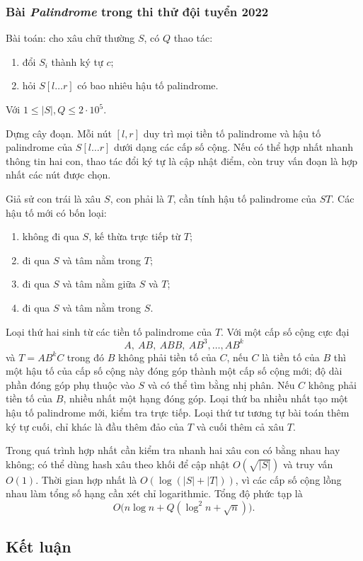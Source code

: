 \documentclass[11pt]{article}
\begin{document}
\subsubsection{Bài \emph{Palindrome} trong thi thử đội tuyển 2022}

Bài toán: cho xâu chữ thường $S$, có $Q$ thao tác:
\begin{enumerate}
  \item đổi $S_i$ thành ký tự $c$;
  \item hỏi $S[l\ldots r]$ có bao nhiêu hậu tố palindrome.
\end{enumerate}
Với $1\le |S|,Q\le 2\cdot 10^5$.

Dựng cây đoạn. Mỗi nút $[l,r]$ duy trì mọi tiền tố palindrome và hậu tố
palindrome của $S[l\ldots r]$ dưới dạng các cấp số cộng. Nếu có thể hợp nhất
nhanh thông tin hai con, thao tác đổi ký tự là cập nhật điểm, còn truy vấn đoạn
là hợp nhất các nút được chọn.

Giả sử con trái là xâu $S$, con phải là $T$, cần tính hậu tố palindrome của
$ST$. Các hậu tố mới có bốn loại:
\begin{enumerate}
  \item không đi qua $S$, kế thừa trực tiếp từ $T$;
  \item đi qua $S$ và tâm nằm trong $T$;
  \item đi qua $S$ và tâm nằm giữa $S$ và $T$;
  \item đi qua $S$ và tâm nằm trong $S$.
\end{enumerate}
Loại thứ hai sinh từ các tiền tố palindrome của $T$. Với một cấp số cộng cực
đại
\[
  A,\ AB,\ ABB,\ AB^3,\ldots,AB^k
\]
và $T=AB^kC$ trong đó $B$ không phải tiền tố của $C$, nếu $C$ là tiền tố của
$B$ thì một hậu tố của cấp số cộng này đóng góp thành một cấp số cộng mới; độ
dài phần đóng góp phụ thuộc vào $S$ và có thể tìm bằng nhị phân. Nếu $C$ không
phải tiền tố của $B$, nhiều nhất một hạng đóng góp. Loại thứ ba nhiều nhất tạo
một hậu tố palindrome mới, kiểm tra trực tiếp. Loại thứ tư tương tự bài toán
thêm ký tự cuối, chỉ khác là đầu thêm đảo của $T$ và cuối thêm cả xâu $T$.

Trong quá trình hợp nhất cần kiểm tra nhanh hai xâu con có bằng nhau hay không;
có thể dùng hash xâu theo khối để cập nhật $O(\sqrt{|S|})$ và truy vấn $O(1)$.
Thời gian hợp nhất là $O(\log(|S|+|T|))$, vì các cấp số cộng lồng nhau làm tổng
số hạng cần xét chỉ logarithmic. Tổng độ phức tạp là
\[
  O\bigl(n\log n+Q(\log^2 n+\sqrt n)\bigr).
\]

\subsection{Kết luận}
\end{document}
